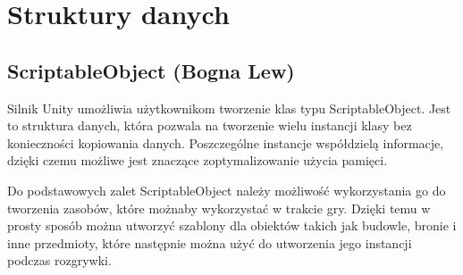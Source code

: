 \section{Struktury danych}
\subsection{ScriptableObject (Bogna Lew)}
Silnik Unity umożliwia użytkownikom tworzenie klas typu ScriptableObject. Jest to struktura danych, która pozwala na
tworzenie wielu instancji klasy bez konieczności kopiowania danych. Poszczególne instancje współdzielą informacje, dzięki
czemu możliwe jest znaczące zoptymalizowanie użycia pamięci.

Do podstawowych zalet ScriptableObject należy możliwość wykorzystania go do tworzenia zasobów, które możnaby wykorzystać
w trakcie gry. Dzięki temu w prosty sposób można utworzyć szablony dla obiektów takich jak budowle, bronie i inne
przedmioty, które następnie można użyć do utworzenia jego instancji podczas rozgrywki.
